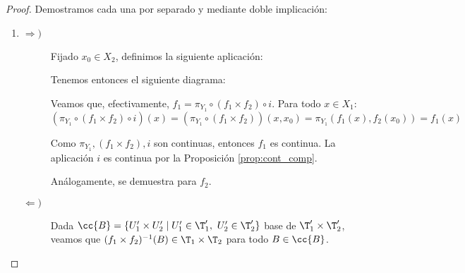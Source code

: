 \begin{proof}
    Demostramos cada una por separado y mediante doble implicación:
    \begin{enumerate}
        \item \begin{description}
            \item[$\Longrightarrow)$] Fijado $x_0\in X_2$, definimos la siguiente aplicación:

            Tenemos entonces el siguiente diagrama:
            \begin{figure}[H]
                \centering
            \end{figure}
            Veamos que, efectivamente, $f_1 = \pi_{Y_1}\circ (f_1\times f_2)\circ i$. Para todo $x\in X_1$:
            \begin{equation*}
                (\pi_{Y_1}\circ (f_1\times f_2)\circ i)(x) = (\pi_{Y_1}\circ (f_1\times f_2))(x,x_0) = \pi_{Y_1}(f_1(x), f_2(x_0)) = f_1(x)
            \end{equation*}

            Como $\pi_{Y_1}, (f_1\times f_2), i$ son continuas, entonces $f_1$ es continua. La aplicación $i$ es continua por la Proposición \ref{prop:cont_comp}.
            
            Análogamente, se demuestra para $f_2$.
            
            \item[$\Longleftarrow)$] Dada $\cc{B}=\{U_1'\times U_2'\mid U_1'\in \T_1',~U_2'\in \T_2'\}$ base de $\T_1'\times \T_2'$, veamos que $(f_1\times f_2)^{-1}(B)\in \T_1\times \T_2$ para todo $B\in \cc{B}$.


\end{description}
\end{enumerate}
\end{proof}
